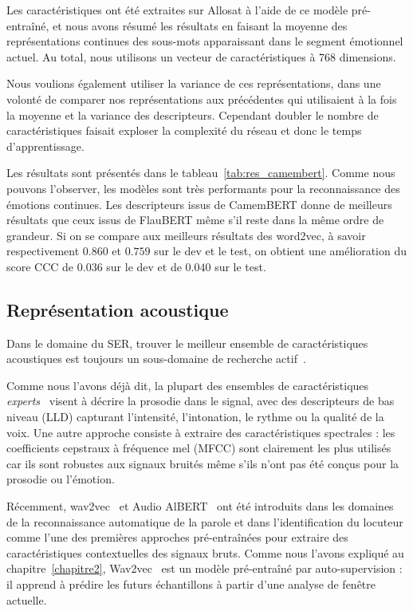 Les caractéristiques ont été extraites sur Allosat à l'aide de ce modèle pré-entraîné, et nous avons résumé les résultats en faisant la moyenne des représentations continues des sous-mots apparaissant dans le segment émotionnel actuel. Au total, nous utilisons un vecteur de caractéristiques à 768 dimensions.

Nous voulions également utiliser la variance de ces représentations, dans une volonté de comparer nos représentations aux précédentes qui utilisaient à la fois la moyenne et la variance des descripteurs. Cependant doubler le nombre de caractéristiques faisait exploser la complexité du réseau et donc le temps d'apprentissage.

Les résultats sont présentés dans le tableau~\ref{tab:res_camembert}. Comme nous pouvons l'observer, les modèles sont très performants pour la reconnaissance des émotions continues. Les descripteurs issus de CamemBERT donne de meilleurs résultats que ceux issus de FlauBERT même s'il reste dans la même ordre de grandeur. Si on se compare aux meilleurs résultats des word2vec, à savoir respectivement $0.860$ et $0.759$ sur le dev et le test, on obtient une amélioration du score CCC de 0$.036$ sur le dev et de $0.040$ sur le test.



\subsection{Représentation acoustique}
Dans le domaine du SER, trouver le meilleur ensemble de caractéristiques acoustiques est toujours un sous-domaine de recherche actif~\cite{Jing2018}.

Comme nous l'avons déjà dit, la plupart des ensembles de caractéristiques \textit{experts}~\cite{Eyben2016,Schuller2013} visent à décrire la prosodie dans le signal, avec des descripteurs de bas niveau (LLD) capturant l'intensité, l'intonation, le rythme ou la qualité de la voix.
Une autre approche consiste à extraire des caractéristiques spectrales : les coefficients cepstraux à fréquence mel (MFCC) sont clairement les plus utilisés car ils sont robustes aux signaux bruités même s'ils n'ont pas été conçus pour la prosodie ou l'émotion.

Récemment, wav2vec~\cite{Schneider2019} et Audio AlBERT~\cite{Chi2020} ont été introduits dans les domaines de la reconnaissance automatique de la parole et dans l'identification du locuteur comme l'une des premières approches pré-entraînées pour extraire des caractéristiques contextuelles des signaux bruts.
Comme nous l'avons expliqué au chapitre~\ref{chapitre2}, Wav2vec~\cite{Schneider2019} est un modèle pré-entraîné par auto-supervision : il apprend à prédire les futurs échantillons à partir d'une analyse de fenêtre actuelle.

